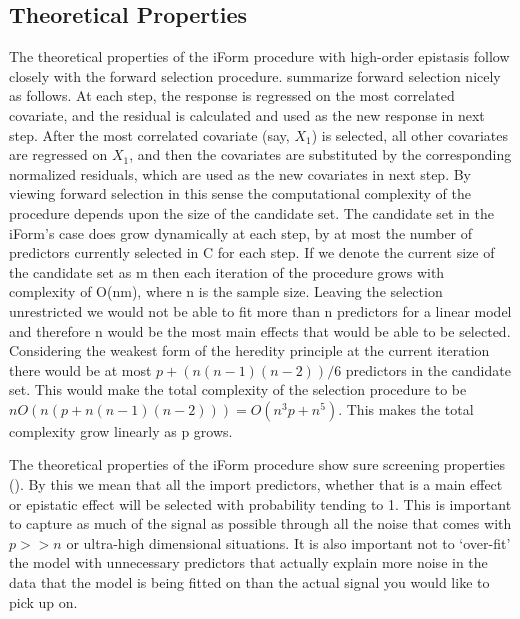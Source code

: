 \documentclass[11pt,]{book}
\theoremstyle{definition}
\theoremstyle{definition}
\theoremstyle{remark}
\begin{document}
\subsection{Theoretical Properties}\label{theoretical-properties}

The theoretical properties of the iForm procedure with high-order
epistasis follow closely with the forward selection procedure.
\cite{hao2014interaction} summarize forward selection nicely as follows.
At each step, the response is regressed on the most correlated
covariate, and the residual is calculated and used as the new response
in next step. After the most correlated covariate (say, \(X_1\)) is
selected, all other covariates are regressed on \(X_1\), and then the
covariates are substituted by the corresponding normalized residuals,
which are used as the new covariates in next step. By viewing forward
selection in this sense the computational complexity of the procedure
depends upon the size of the candidate set. The candidate set in the
iForm's case does grow dynamically at each step, by at most the number
of predictors currently selected in C for each step. If we denote the
current size of the candidate set as m then each iteration of the
procedure grows with complexity of O(nm), where n is the sample size.
Leaving the selection unrestricted we would not be able to fit more than
n predictors for a linear model and therefore n would be the most main
effects that would be able to be selected. Considering the weakest form
of the heredity principle at the current iteration there would be at
most \(p+(n(n-1)(n-2))/6\) predictors in the candidate set. This would
make the total complexity of the selection procedure to be
\(nO(n(p+n(n-1)(n-2)))=O(n^3 p+n^5 )\). This makes the total complexity
grow linearly as p grows.

The theoretical properties of the iForm procedure show sure screening
properties (\cite{fan2008sure}). By this we mean that all the import
predictors, whether that is a main effect or epistatic effect will be
selected with probability tending to 1. This is important to capture as
much of the signal as possible through all the noise that comes with
\(p >> n\) or ultra-high dimensional situations. It is also important
not to `over-fit' the model with unnecessary predictors that actually
explain more noise in the data that the model is being fitted on than
the actual signal you would like to pick up on.
\end{document}
